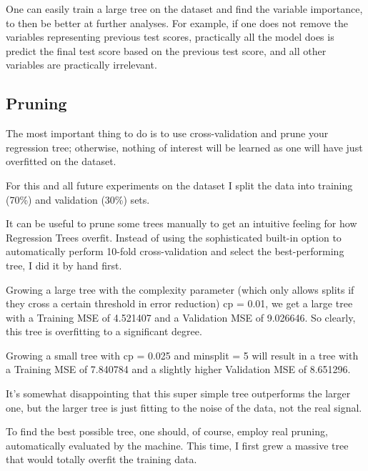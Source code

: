 \documentclass[12pt]{article}
\begin{document}
One can easily train a large tree on the dataset and find the variable importance, to then be better at further analyses. For example, if one does not remove the variables representing previous test scores, practically all the model does is predict the final test score based on the previous test score, and all other variables are practically irrelevant.


\subsection{Pruning}

The most important thing to do is to use cross-validation and prune your regression tree; otherwise, nothing of interest will be learned as one will have just overfitted on the dataset.

For this and all future experiments on the dataset I split the data into training (70\%) and validation (30\%) sets.

It can be useful to prune some trees manually to get an intuitive feeling for how Regression Trees overfit. Instead of using the sophisticated built-in option to automatically perform 10-fold cross-validation and select the best-performing tree, I did it by hand first.


Growing a large tree with the complexity parameter (which only allows splits if they cross a certain threshold in error reduction) cp = 0.01, we get a large tree with a Training MSE of 4.521407 and a Validation MSE of 9.026646. So clearly, this tree is overfitting to a significant degree.

Growing a small tree with cp = 0.025 and minsplit = 5 will result in a tree with a Training MSE of 7.840784 and a slightly higher Validation MSE of 8.651296.

It's somewhat disappointing that this super simple tree outperforms the larger one, but the larger tree is just fitting to the noise of the data, not the real signal.

To find the best possible tree, one should, of course, employ real pruning, automatically evaluated by the machine. This time, I first grew a massive tree that would totally overfit the training data.
\end{document}
